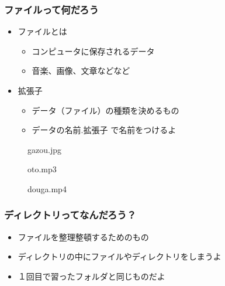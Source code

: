 \begin{frame}
    \frametitle{ファイルって何だろう}
    \begin{itemize}
        \item ファイルとは
        \begin{itemize}
            \item コンピュータに保存されるデータ
            \item 音楽、画像、文章などなど
        \end{itemize}
        \item 拡張子
        \begin{itemize}
            \item データ（ファイル）の種類を決めるもの
            \item データの名前.拡張子 で名前をつけるよ
        \end{itemize}
    \end{itemize}
    
    \begin{figure}[h]
    \centering
    \begin{minipage}[b]{0.32\columnwidth}
        \centering
        
        \caption{gazou.jpg}
    \end{minipage}
    \begin{minipage}[b]{0.32\columnwidth}
        \centering
        
        \caption{oto.mp3}
    \end{minipage}
    \begin{minipage}[b]{0.32\columnwidth}
        \centering
        
        \caption{douga.mp4}
    \end{minipage}
    \end{figure}
\end{frame}

\begin{frame}
    \frametitle{ディレクトリってなんだろう？}
    \begin{itemize}
        \item ファイルを整理整頓するためのもの
        \item ディレクトリの中にファイルやディレクトリをしまうよ
        \item １回目で習ったフォルダと同じものだよ
    \end{itemize}
\end{frame}

